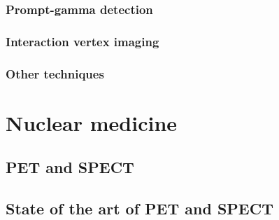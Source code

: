 \subsubsection{Prompt-gamma detection}\label{chap1::subsec::PGgeneral}

\subsubsection{Interaction vertex imaging}\label{chap1::subsec::IVI}

\subsubsection{Other techniques}\label{chap1::subsec::rangeComplTechniques}




\section{Nuclear medicine}\label{chap1::sec::NuclearMed}


\subsection{PET and SPECT}\label{chap1::subsec::PET-SPECT}


\subsection{State of the art of PET and SPECT}


\clearpage
